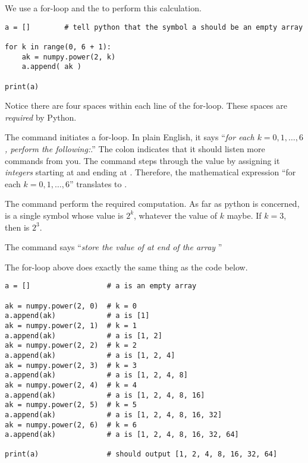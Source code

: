 \documentclass[../main.tex]{subfiles}
\begin{document}
\begin{enumerate}
    We use a for-loop and the  to perform this calculation.

    \begin{verbatim}
a = []        # tell python that the symbol a should be an empty array

for k in range(0, 6 + 1):  
    ak = numpy.power(2, k)
    a.append( ak )

print(a)
    \end{verbatim}
    \faExclamationTriangle{} Notice there are four spaces within each line of the for-loop. These spaces are \emph{required} by Python.

    The command  initiates a for-loop. In plain English, it says ``\emph{for each \(k = 0, 1, \ldots, 6\), perform the following:}.''  The colon indicates that it should listen more commands from you.   The  command steps through the value  by assigning it \emph{integers} starting at  and ending at .  Therefore, the mathematical expression ``for each \(k = 0, 1, \ldots, 6\)'' translates to .

    The command  perform the required computation. As far as python is concerned,  is a single symbol whose value is \(2^{k}\), whatever the value of \(k\) maybe.  If \(k = 3\), then  is \(2^{3}\). 

    The command  says ``\emph{store the value of  at end of the array }''

    The for-loop above does exactly the same thing as the code below.
    \begin{verbatim}
a = []                  # a is an empty array

ak = numpy.power(2, 0)  # k = 0
a.append(ak)            # a is [1]
ak = numpy.power(2, 1)  # k = 1
a.append(ak)            # a is [1, 2]
ak = numpy.power(2, 2)  # k = 2
a.append(ak)            # a is [1, 2, 4]
ak = numpy.power(2, 3)  # k = 3
a.append(ak)            # a is [1, 2, 4, 8]
ak = numpy.power(2, 4)  # k = 4
a.append(ak)            # a is [1, 2, 4, 8, 16]
ak = numpy.power(2, 5)  # k = 5
a.append(ak)            # a is [1, 2, 4, 8, 16, 32]
ak = numpy.power(2, 6)  # k = 6
a.append(ak)            # a is [1, 2, 4, 8, 16, 32, 64]

print(a)                # should output [1, 2, 4, 8, 16, 32, 64]
    \end{verbatim}

\end{enumerate}
\end{document}
